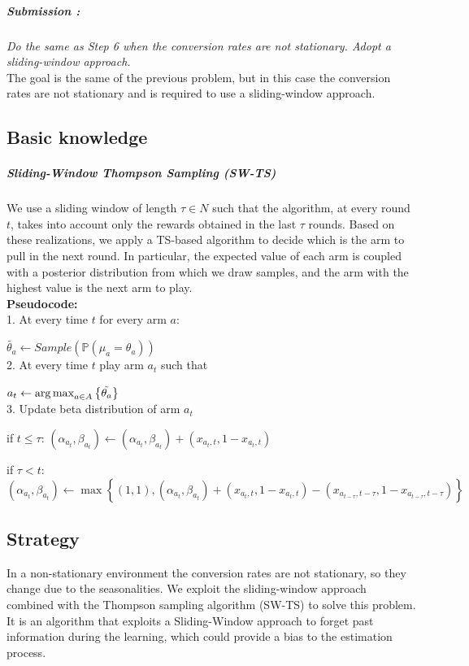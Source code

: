\subparagraph*{Submission : }
\textit{Do the same as Step 6 when the conversion rates are not stationary. Adopt a sliding-window approach.}\\

The goal is the same of the previous problem, but in this case the conversion rates are not stationary and is required to use a sliding-window approach.

\subsection*{Basic knowledge}
\subparagraph*{Sliding-Window Thompson Sampling (SW-TS)} 
We use a sliding window of length $\tau\in N$ such that the algorithm, at every round $t$, takes into account only the rewards obtained in the last $\tau$ rounds. Based on these realizations, we apply a TS-based algorithm to decide which is the arm to pull in the next round. In particular, the expected value of each arm is coupled with a posterior distribution from which we draw samples, and the arm with the highest value is the next arm to play.\\

\textbf{Pseudocode:}\\

1. At every time $t$ for every arm $a$:

$\tilde{\theta_{a}} \leftarrow Sample(\mathbb P(\mu_{a}=\theta_{a}))$ \\

2. At every time $t$ play arm $a_{t}$ such that 

$a_{t} \leftarrow \operatorname{arg\,max}_{a \in A} \left\{ \tilde{\theta_{a}}  \right\} $ \\

3.  Update beta distribution of arm $a_{t}$

if $t\leq\tau$: $(\alpha_{a_{t}}, \beta_{a_{t}}) \leftarrow (\alpha_{a_{t}}, \beta_{a_{t}}) + (x_{a_{t},t}, 1 - x_{a_{t},t})$ 

if $\tau<t$:	$(\alpha_{a_{t}}, \beta_{a_{t}}) \leftarrow \max \left\{(1,1), (\alpha_{a_{t}}, \beta_{a_{t}}) + (x_{a_{t},t}, 1 - x_{a_{t},t}) - (x_{a_{t-\tau},t-\tau}, 1 - x_{a_{t-\tau},t-\tau})    \right\}$

\subsection*{Strategy}
In a non-stationary environment the conversion rates are not stationary, so they change due to the seasonalities.
We exploit the sliding-window approach combined with the Thompson sampling algorithm (SW-TS) to solve this problem. It is an algorithm that exploits a Sliding-Window approach to forget past information  during the learning, which could provide a bias to the estimation process.

